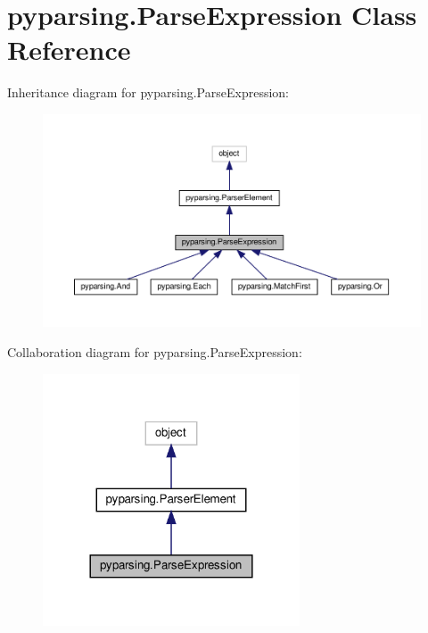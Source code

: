 \hypertarget{classpyparsing_1_1ParseExpression}{}\section{pyparsing.\+Parse\+Expression Class Reference}
\label{classpyparsing_1_1ParseExpression}


Inheritance diagram for pyparsing.\+Parse\+Expression\+:
\nopagebreak
\begin{figure}[H]
\begin{center}
\leavevmode
\includegraphics[width=350pt]{classpyparsing_1_1ParseExpression__inherit__graph}
\end{center}
\end{figure}


Collaboration diagram for pyparsing.\+Parse\+Expression\+:
\nopagebreak
\begin{figure}[H]
\begin{center}
\leavevmode
\includegraphics[width=216pt]{classpyparsing_1_1ParseExpression__coll__graph}
\end{center}
\end{figure}

